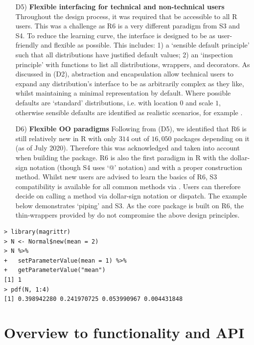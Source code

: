 \begin{itemize}
\item[D5)] \textbf{Flexible interfacing for technical and non-technical users} Throughout the design process, it was required that  be accessible to all R users. This was a challenge as R6 is a very different paradigm from S3 and S4. To reduce the learning curve, the interface is designed to be as  user-friendly and flexible as possible. This includes: 1) a `sensible default principle' such that all distributions have justified default values; 2) an `inspection principle' with functions to list all distributions, wrappers, and decorators. As discussed in (D2), abstraction and encapsulation allow technical users to expand any distribution's interface to be as arbitrarily complex as they like, whilst maintaining a minimal representation by default. Where possible defaults are `standard' distributions, i.e. with location $0$ and scale $1$, otherwise sensible defaults are identified as realistic scenarios, for example .

\item[D6)] \textbf{Flexible OO paradigms} Following from (D5), we identified that R6 is still relatively new in R with only $314$ out of $16, 050$ packages depending on it (as of July 2020). Therefore this was acknowledged and taken into account when building the package. R6 is also the first paradigm in R with the dollar-sign notation (though S4 uses `@' notation) and with a proper construction method. Whilst new users are advised to learn the basics of R6, S3 compatibility is available for all common methods via  \citep{pkgr62s3}. Users can therefore decide on calling a method via dollar-sign notation or dispatch. The example below demonstrates `piping' and S3. As the core package is built on R6, the thin-wrappers provided by  do not compromise the above design principles.
\end{itemize}

\begin{verbatim}
> library(magrittr)
> N <- Normal$new(mean = 2)
> N %>%
+   setParameterValue(mean = 1) %>%
+   getParameterValue("mean")
[1] 1
> pdf(N, 1:4)
[1] 0.398942280 0.241970725 0.053990967 0.004431848
\end{verbatim}

\section{Overview to functionality and API}
\label{sec:tools_distr6_api}

